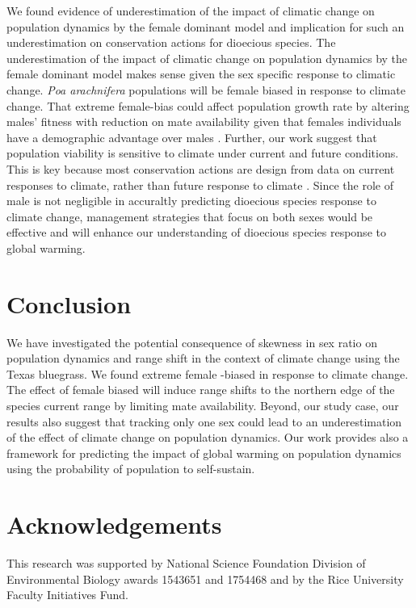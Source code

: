 \documentclass[12pt]{article}\usepackage[]{graphicx}\usepackage[dvipsnames]{xcolor}
\begin{document}
We found evidence of underestimation of the impact of climatic change on population dynamics by the female dominant model and implication for such an underestimation on conservation actions for dioecious species.
The underestimation of the impact of climatic change on population dynamics by the female dominant model makes sense given the sex specific response to climatic change. 
\emph{Poa arachnifera} populations will be female biased in response to climate change.
That extreme female-bias could affect population growth rate by altering males’ fitness with reduction on mate availability given that females individuals have a demographic advantage over males \citep{knight2005pollen,haridas2014frequency}.
Further, our work suggest that population viability is sensitive to climate under current  and future conditions.
This is key because most conservation actions are design from  data on current responses to climate, rather than future response to climate \citep{sletvold2013climate}.
Since the role of male is not negligible in accuraltly predicting dioecious species response to climate change, management strategies that focus on both sexes would be effective and will enhance our understanding of dioecious species response to global warming.

\section*{Conclusion}
We have investigated the potential consequence of skewness in sex ratio on population dynamics and range shift in the context of climate change using the Texas bluegrass. 
We found extreme female -biased in response to climate change. 
The effect of female biased will induce range shifts to the northern edge of the species current range by limiting mate availability.
Beyond, our study case, our results also suggest that tracking only one sex could lead to an underestimation of the effect of climate change on population dynamics. 
Our work  provides also a framework for predicting the impact of global warming on population dynamics using the probability of population to self-sustain. 

\section*{Acknowledgements}
This research was supported by National Science Foundation Division of Environmental Biology awards 1543651 and 1754468 and by the Rice University Faculty Initiatives Fund.
\end{document}
